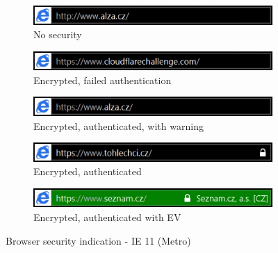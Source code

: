 \begin{figure}
  \begin{subfigure}[b]{\textwidth}
    \centering
    \includegraphics[scale=0.6]{images/browsers/iemetro-none.png}
    \caption{No security}
  \end{subfigure}
  \begin{subfigure}[b]{\textwidth}
    \centering
    \includegraphics[scale=0.6]{images/browsers/iemetro-untrusted.png}
    \caption{Encrypted, failed authentication}
  \end{subfigure}
  \begin{subfigure}[b]{\textwidth}
    \centering
    \includegraphics[scale=0.6]{images/browsers/iemetro-warning.png}
    \caption{Encrypted, authenticated, with warning}
  \end{subfigure}
  \begin{subfigure}[b]{\textwidth}
    \centering
    \includegraphics[scale=0.6]{images/browsers/iemetro-dv.png}
    \caption{Encrypted, authenticated}
  \end{subfigure}
  \begin{subfigure}[b]{\textwidth}
    \centering
    \includegraphics[scale=0.6]{images/browsers/iemetro-ev.png}
    \caption{Encrypted, authenticated with EV}
  \end{subfigure}
  \caption{Browser security indication - IE 11 (Metro)}
\end{figure}

